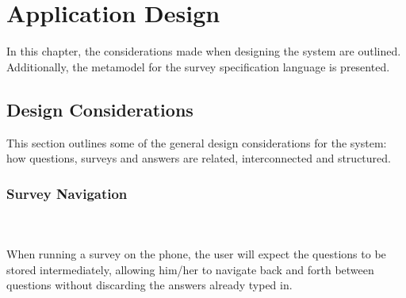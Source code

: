 \chapter{Application Design}
\label{chap:design}
In this chapter, the considerations made when designing the system are outlined. Additionally, the metamodel for the survey specification language is presented.

\section{Design Considerations}
\label{sec:designconsiderations}
This section outlines some of the general design considerations for the system: how questions, surveys and answers are related, interconnected and structured.

\subsection{Survey Navigation}
\label{subsec:surveynavigation}
\kim \\\\
When running a survey on the phone, the user will expect the questions to be stored intermediately, allowing him/her to navigate back and forth between questions without discarding the answers already typed in.
